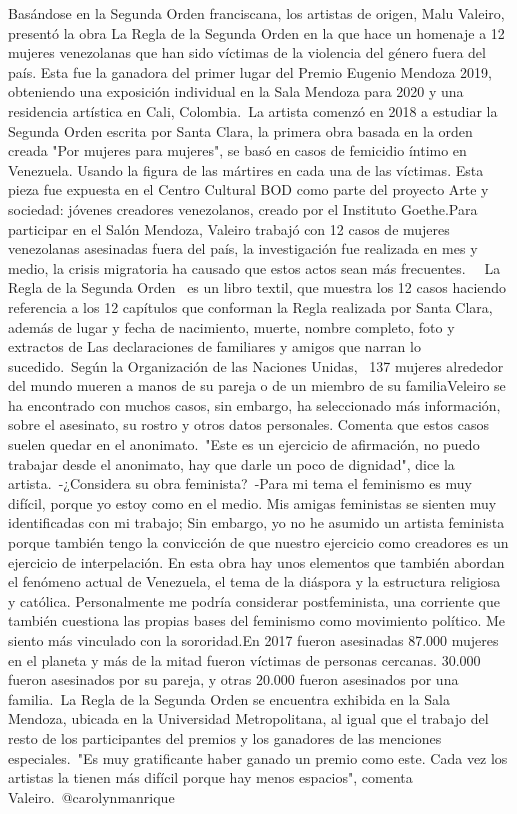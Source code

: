 \documentclass{article}%
\begin{document}
Basándose en la Segunda Orden franciscana, los artistas de origen, Malu Valeiro, presentó la obra La Regla de la Segunda Orden en la que hace un homenaje a 12 mujeres venezolanas que han sido víctimas de la violencia del género fuera del país. Esta fue la ganadora del primer lugar del Premio Eugenio Mendoza 2019, obteniendo una exposición individual en la Sala Mendoza para 2020 y una residencia artística en Cali, Colombia.~La artista comenzó en 2018 a estudiar la Segunda Orden escrita por Santa Clara, la primera obra basada en la orden creada "Por mujeres para mujeres", se basó en casos de femicidio íntimo en Venezuela. Usando la figura de las mártires en cada una de las víctimas. Esta pieza fue expuesta en el Centro Cultural BOD como parte del proyecto Arte y sociedad: jóvenes creadores venezolanos, creado por el Instituto Goethe.Para participar en el Salón Mendoza, Valeiro trabajó con 12 casos de mujeres venezolanas asesinadas fuera del país, la investigación fue realizada en mes y medio, la crisis migratoria ha causado que estos actos sean más frecuentes.~ ~La Regla de la Segunda Orden  ~es un libro textil, que muestra los 12 casos haciendo referencia a los 12 capítulos que conforman la Regla realizada por Santa Clara, además de lugar y fecha de nacimiento, muerte, nombre completo, foto y extractos de Las declaraciones de familiares y amigos que narran lo sucedido.~Según la Organización de las Naciones Unidas,~  137 mujeres alrededor del mundo mueren a manos de su pareja o de un miembro de su familiaVeleiro se ha encontrado con muchos casos, sin embargo, ha seleccionado más información, sobre el asesinato, su rostro y otros datos personales. Comenta que estos casos suelen quedar en el anonimato.~"Este es un ejercicio de afirmación, no puedo trabajar desde el anonimato, hay que darle un poco de dignidad", dice la artista.~{-}¿Considera su obra feminista?~{-}Para mi tema el feminismo es muy difícil, porque yo estoy como en el medio. Mis amigas feministas se sienten muy identificadas con mi trabajo; Sin embargo, yo no he asumido un artista feminista porque también tengo la convicción de que nuestro ejercicio como creadores es un ejercicio de interpelación. En esta obra hay unos elementos que también abordan el fenómeno actual de Venezuela, el tema de la diáspora y la estructura religiosa y católica. Personalmente me podría considerar postfeminista, una corriente que también cuestiona las propias bases del feminismo como movimiento político. Me siento más vinculado con la sororidad.En 2017 fueron asesinadas 87.000 mujeres en el planeta y más de la mitad fueron víctimas de personas cercanas. 30.000 fueron asesinados por su pareja, y otras 20.000 fueron asesinados por una familia.~La Regla de la Segunda Orden se encuentra exhibida en la Sala Mendoza, ubicada en la Universidad Metropolitana, al igual que el trabajo del resto de los participantes del premios y los ganadores de las menciones especiales.~"Es muy gratificante haber ganado un premio como este. Cada vez los artistas la tienen más difícil porque hay menos espacios", comenta Valeiro.~@carolynmanrique%
\newline%
%
\end{document}

